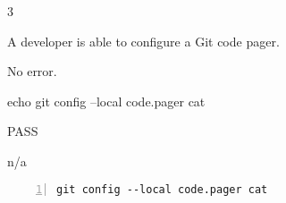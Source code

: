 \begin{description}[align=right,leftmargin=3.2cm,labelindent=3.0cm]
\item[Step:] 3
\item[Confirm:] A developer is able to configure a Git code pager.
\item[Expectation:] No error.
\item[Command:] echo git  config --local code.pager cat
\item[Test Result:] PASS
\item[Evidence:] n/a
\end{description}
\begin{lstlisting}[numbers=left]
git config --local code.pager cat

\end{lstlisting}
